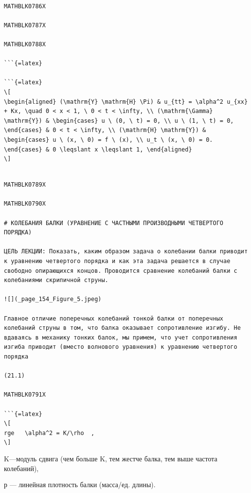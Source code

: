 \documentclass[
]{article}
\begin{document}
\begin{verbatim}

MATHBLK0786X

MATHBLK0787X

MATHBLK0788X

```{=latex}

```{=latex}
\[
\begin{aligned} (\mathrm{Y} \mathrm{H} \Pi) & u_{tt} = \alpha^2 u_{xx} + Kx, \quad 0 < x < 1, \ 0 < t < \infty, \\ (\mathrm{\Gamma} \mathrm{Y}) & \begin{cases} u \ (0, \ t) = 0, \\ u \ (1, \ t) = 0, \end{cases} & 0 < t < \infty, \\ (\mathrm{H} \mathrm{Y}) & \begin{cases} u \ (x, \ 0) = f \ (x), \\ u_t \ (x, \ 0) = 0. \end{cases} & 0 \leqslant x \leqslant 1, \end{aligned}
\]
\end{verbatim}

\begin{verbatim}

MATHBLK0789X

MATHBLK0790X

# КОЛЕБАНИЯ БАЛКИ (УРАВНЕНИЕ С ЧАСТНЫМИ ПРОИЗВОДНЫМИ ЧЕТВЕРТОГО ПОРЯДКА)

ЦЕЛЬ ЛЕКЦИИ: Показать, каким образом задача о колебании балки приводит к уравнению четвертого порядка и как эта задача решается в случае свободно опирающихся концов. Проводится сравнение колебаний балки с колебаниями скрипичной струны.

![](_page_154_Figure_5.jpeg)

Главное отличие поперечных колебаний тонкой балки от поперечных колебаний струны в том, что балка оказывает сопротивление изгибу. Не вдаваясь в механику тонких балок, мы примем, что учет сопротивления изгиба приводит (вместо волнового уравнения) к уравнению четвертого порядка

(21.1)

MATHBLK0791X

```{=latex}
\[
rge   \alpha^2 = K/\rho  ,
\]
\end{verbatim}

K---модуль сдвига (чем больше K, тем жестче балка, тем выше частота
колебаний),

р --- линейная плотность балки (масса/ед. длины).
\end{document}
